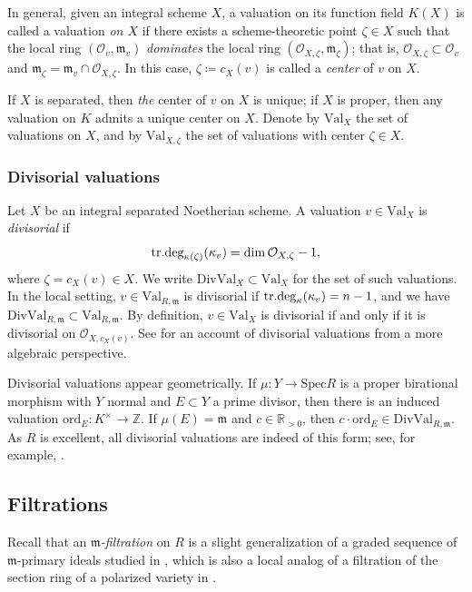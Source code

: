 \documentclass[11pt, leqno]{amsart}%
\theoremstyle{plain}
\theoremstyle{definition}
\theoremstyle{remark}
\newcommand{\cO}{\mathcal{O}}
\newcommand{\bR}{\mathbb{R}}
\newcommand{\bZ}{\mathbb{Z}}
\newcommand{\fm}{\mathfrak{m}}
\newcommand{\ord}{\mathrm{ord}}
\newcommand{\Val}{\mathrm{Val}}
\newcommand{\DivVal}{\mathrm{DivVal}}
\newcommand{\Spec}{\mathrm{Spec}}
\begin{document}
\medskip

In general, given an integral scheme $X$, a valuation on its function field $K(X)$ is called a valuation \emph{on $X$} if there exists a scheme-theoretic point $\zeta\in X$ such that the local ring $(\cO_v,\fm_v)$ \emph{dominates} the local ring $(\cO_{X,\zeta},\fm_\zeta)$; that is, $\cO_{X,\zeta}\subset \cO_v$ and $\fm_\zeta=\fm_v\cap \cO_{X,\zeta}$.  
In this case, $\zeta\coloneqq c_X(v)$ is called a \emph{center} of $v$ on $X$. 

If $X$ is separated, then \emph{the} center of $v$ on $X$ is unique; if $X$ is proper, then any valuation on $K$ admits a unique center on $X$.
Denote by $\Val_X$ the set of valuations on $X$, and by $\Val_{X,\zeta}$ the set of valuations with center $\zeta\in X$. 

\subsubsection{Divisorial valuations}
Let $X$ be an integral separated Noetherian scheme. A valuation $v\in\Val_X$ is \emph{divisorial} if 
\[
    {\rm tr.deg}_{\kappa(\zeta)}(\kappa_v) =\dim \cO_{X,\zeta}-1,
\]
where $\zeta=c_X(v)\in X$. We write $\DivVal_X\subset \Val_X$ for the set of such valuations.
In the local setting, $v\in \Val_{R,\fm}$ is divisorial if 
${\rm tr.deg}_{\kappa}(\kappa_v) =n-1$, and we have $\DivVal_{R,\fm}\subset \Val_{R,\fm}$. 
By definition, $v\in\Val_X$ is divisorial if and only if it is divisorial on $\cO_{X,c_X(v)}$.
See \cite[Section 9.3]{HS-integral-closure} for an account of divisorial valuations from a more algebraic perspective.

Divisorial valuations appear geometrically.  
If $\mu:Y\to \Spec R$ is a proper birational morphism with $Y$ normal and  $E\subset Y$ a prime divisor, 
then there is an induced valuation  $\ord_{E} : K^\times \to \bZ$. 
If $\mu(E) =\fm$ and  $c\in \bR_{>0}$, then $c\cdot \ord_E \in \DivVal_{R,\fm}$.
As $R$ is excellent, all divisorial valuations are indeed of this form; see, for example, \cite[Lemma 6.5]{CS-arbitrary}.





\subsection{Filtrations}
Recall that an \emph{$\fm$-filtration} on $R$ is a slight generalization of a graded sequence of $\fm$-primary ideals studied in \cite{JM-val-ideal-seq}, which is also a local analog of a filtration of the section ring of a polarized variety in \cite{BHJ-DH-measure}.
\end{document}
